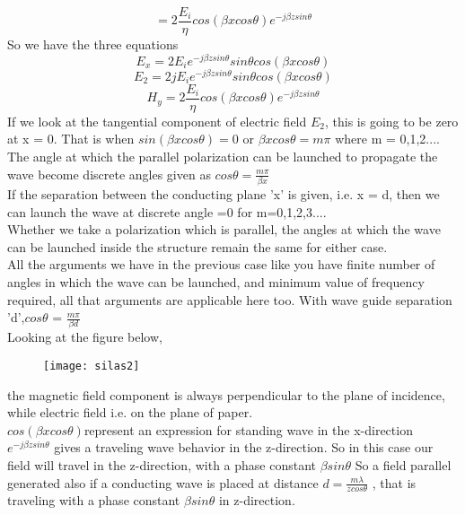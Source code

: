 \begin{equation*}
= 2\frac{E_{i}}{\eta} cos(\beta xcos\theta)e^{-j\beta zsin\theta}
\end{equation*}
So we have the three equations
\begin{equation}
E_x = 2 E_{i} e^{-j\beta zsin\theta} sin\theta cos(\beta xcos\theta)
\end{equation}
\begin{equation}
E_2 = 2 jE_{i} e^{-j\beta zsin\theta} sin\theta cos(\beta xcos\theta)
\end{equation}
\begin{equation}
H_y = 2 \frac{E_{i}}{\eta} cos(\beta xcos\theta) e^{-j\beta zsin\theta} 
\end{equation}
If we look at the tangential component of electric field $E_{2}$, this is going to be zero at x = 0. That is when $sin(\beta xcos\theta) =0$ or $\beta xcos\theta = m\pi$ 
where m = 0,1,2....\\
The angle at which the parallel polarization can be launched to propagate the wave become discrete angles given as $cos\theta = \frac{m\pi}{\beta x}$\\
If the separation between the conducting plane 'x' is given, i.e. x = d, then we can launch the wave at discrete angle =0 for m=0,1,2,3....\\
Whether we take a polarization which is parallel, the angles at which the wave can be launched inside the structure remain the same for either case. \\
All the arguments we have in the previous case like you have finite number of angles in which the wave can be launched, and minimum value of frequency required, all that arguments are applicable here too. With wave guide separation 'd',$cos\theta$ = $\frac{m\pi}{\beta d}$\\
Looking at the figure below,\\
\begin{figure}[h]
	\centering
	\texttt{[image: silas2]}
	\caption{}
\end{figure}
the magnetic field component is always perpendicular to the plane of incidence, while electric field i.e. on the plane of paper.\\
$cos(\beta xcos\theta)$represent an expression for standing wave in the x-direction 
$e^{-j\beta zsin\theta}$ gives a traveling wave behavior in the z-direction. So in this case our field will travel in the z-direction, with a phase constant $\beta sin\theta$ 
So a field parallel generated also if a conducting wave is placed at distance $d= \frac{m\lambda}{z cos\theta}$ , that is traveling with a phase constant $\beta sin\theta$ in z-direction.\\ 
